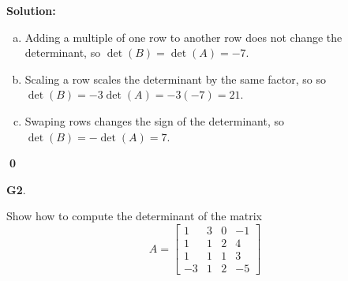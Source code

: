 \documentclass{article}
\newenvironment{problem}[1]
{
  \begin{flushleft}
  \textbf{#1}.
  \ignorespaces
}
{
  \end{flushleft}
}
\newenvironment{solution}
{
  \ignorespaces
  \textbf{Solution:}
}
{
  \ignorespacesafterend
  \begin{flushright}
  {\bfseries \qed}
  \end{flushright}
}
\begin{document}
\begin{solution}
\begin{enumerate}[(a)]
\item Adding a multiple of one row to another row does not change the determinant, so \(\det(B)=\det(A)=-7\).
\item Scaling a row scales the determinant by the same factor, so so \(\det(B)=-3\det(A)=-3(-7)=21\).
\item Swaping rows changes the sign of the determinant, so \(\det(B)=-\det(A)=7\).
\end{enumerate}
\end{solution}

\begin{problem}{G2}
Show how to compute the determinant of the matrix
\[
  A
    =
  \begin{bmatrix}
    1 & 3 & 0 & -1 \\
    1 & 1 & 2 & 4 \\
    1 & 1 & 1 & 3 \\
    -3 & 1 & 2 & -5
  \end{bmatrix}
\]
\end{problem}
\end{document}
